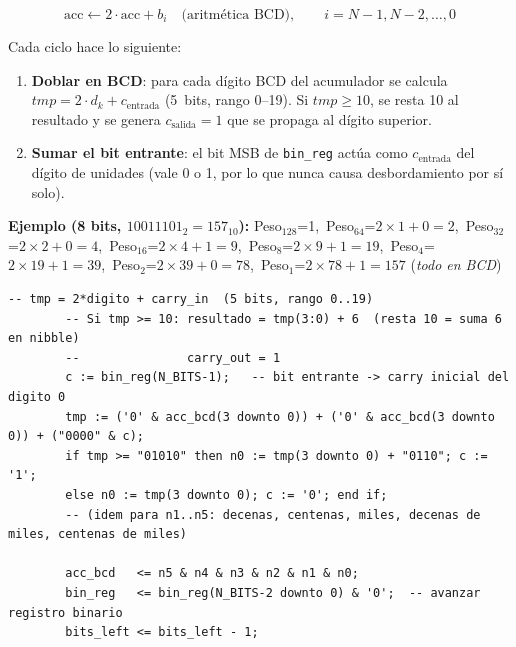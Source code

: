 \documentclass[memoria_final]{subfiles}
\begin{document}
	$$\text{acc} \leftarrow 2 \cdot \text{acc} + b_i \quad \text{(aritmética BCD)}, \qquad i = N-1, N-2, \ldots, 0$$

	Cada ciclo hace lo siguiente:

	\begin{enumerate}[leftmargin=1.8cm, label=\textbf{Paso \arabic*.}]
		\item \textbf{Doblar en BCD}: para cada dígito BCD del acumulador se calcula
		$\mathit{tmp} = 2 \cdot d_k + c_{\text{entrada}}$ (5~bits, rango 0--19). Si
		$\mathit{tmp} \geq 10$, se resta 10 al resultado y se genera $c_{\text{salida}}=1$
		que se propaga al dígito superior.

		\item \textbf{Sumar el bit entrante}: el bit MSB de \texttt{bin\_reg} actúa
		como $c_{\text{entrada}}$ del dígito de unidades (vale 0 o 1, por lo que nunca
		causa desbordamiento por sí solo).
	\end{enumerate}

	\begin{tcolorbox}[colback=SoftBlue, colframe=MainBlue, boxrule=0.8pt, arc=2pt,
		left=0.4cm, right=0.4cm, top=0.2cm, bottom=0.2cm]
		\small\faLightbulb\enspace\textbf{Ejemplo (8 bits, $10011101_2 = 157_{10}$):}
		Peso$_{128}$=1,\ Peso$_{64}$=$2{\times}1{+}0=2$,\ Peso$_{32}$=$2{\times}2{+}0=4$,\
		Peso$_{16}$=$2{\times}4{+}1=9$,\ Peso$_8$=$2{\times}9{+}1=19$,\
		Peso$_4$=$2{\times}19{+}1=39$,\ Peso$_2$=$2{\times}39{+}0=78$,\
		Peso$_1$=$2{\times}78{+}1=157$ (\textit{todo en BCD})
	\end{tcolorbox}

	\begin{lstlisting}[caption={Núcleo del algoritmo de suma de pesos en \texttt{bin\_to\_bcd.vhd}}]
		-- tmp = 2*digito + carry_in  (5 bits, rango 0..19)
		-- Si tmp >= 10: resultado = tmp(3:0) + 6  (resta 10 = suma 6 en nibble)
		--               carry_out = 1
		c := bin_reg(N_BITS-1);   -- bit entrante -> carry inicial del digito 0
		tmp := ('0' & acc_bcd(3 downto 0)) + ('0' & acc_bcd(3 downto 0)) + ("0000" & c);
		if tmp >= "01010" then n0 := tmp(3 downto 0) + "0110"; c := '1';
		else n0 := tmp(3 downto 0); c := '0'; end if;
		-- (idem para n1..n5: decenas, centenas, miles, decenas de miles, centenas de miles)

		acc_bcd   <= n5 & n4 & n3 & n2 & n1 & n0;
		bin_reg   <= bin_reg(N_BITS-2 downto 0) & '0';  -- avanzar registro binario
		bits_left <= bits_left - 1;
	\end{lstlisting}
	
\end{document}
